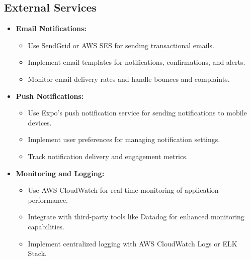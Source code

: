 \subsection{External Services}
\begin{itemize}[leftmargin=*]
    \item \textbf{Email Notifications:}
    \begin{itemize}
        \item Use SendGrid or AWS SES for sending transactional emails.
        \item Implement email templates for notifications, confirmations, and alerts.
        \item Monitor email delivery rates and handle bounces and complaints.
    \end{itemize}
    
    \item \textbf{Push Notifications:}
    \begin{itemize}
        \item Use Expo's push notification service for sending notifications to mobile devices.
        \item Implement user preferences for managing notification settings.
        \item Track notification delivery and engagement metrics.
    \end{itemize}
    
    \item \textbf{Monitoring and Logging:}
    \begin{itemize}
        \item Use AWS CloudWatch for real-time monitoring of application performance.
        \item Integrate with third-party tools like Datadog for enhanced monitoring capabilities.
        \item Implement centralized logging with AWS CloudWatch Logs or ELK Stack.
    \end{itemize}
\end{itemize}

